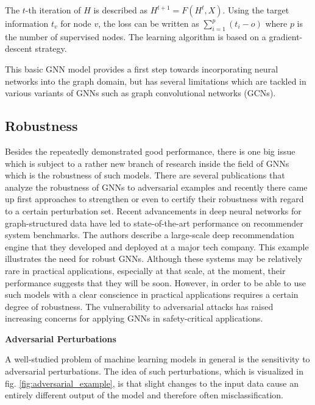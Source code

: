 \documentclass[a4paper,preprint]{sig-alternate}
\begin{document}
The $t$-th iteration of $H$ is described as $H^{t + 1} = F(H^t, X)$.
Using the target information $t_v$ for node $v$, the loss can be written as $\sum_{i=1}^p (t_i - o)$
where $p$ is the number of supervised nodes. The learning algorithm is based on a gradient-descent strategy.\newline

\vfill
\pagebreak

This basic GNN model provides a first step towards incorporating neural networks into the graph domain, 
but has several limitations \cite{article} which are tackled in various variants of GNNs such as graph convolutional networks (GCNs).

\subsection{Robustness}

Besides the repeatedly demonstrated good performance, there is one big issue which is subject to a rather new branch of 
research inside the field of GNNs which is the robustness of such models. There are several publications that analyze 
the robustness of GNNs to adversarial examples and recently there came up first approaches to strengthen
or even to certify their robustness with regard to a certain perturbation set.\newline
Recent advancements in deep neural networks for graph-structured data have led to state-of-the-art performance on recommender system benchmarks.\cite{Ying_2018}
The authors describe a large-scale deep recommendation engine that they developed and deployed at a major tech company.
This example illustrates the need for robust GNNs. Although these systems may be relatively rare in practical applications, especially at
that scale, at the moment, their performance suggests that they will be soon. However, in order to be able to use such models
with a clear conscience in practical applications requires a certain degree of robustness.
The vulnerability to adversarial attacks has raised increasing concerns for applying GNNs in safety-critical applications.\cite{jin2020graph}\newline

\textbf{Adversarial Perturbations}\newline

A well-studied problem of machine learning models in general is the sensitivity to adversarial perturbations.\cite{goodfellow2015explaining}
The idea of such perturbations, which is visualized in fig. \ref{fig:adversarial_example}, is that slight changes to the input data
cause an entirely different output of the model and therefore often misclassification.
\end{document}
